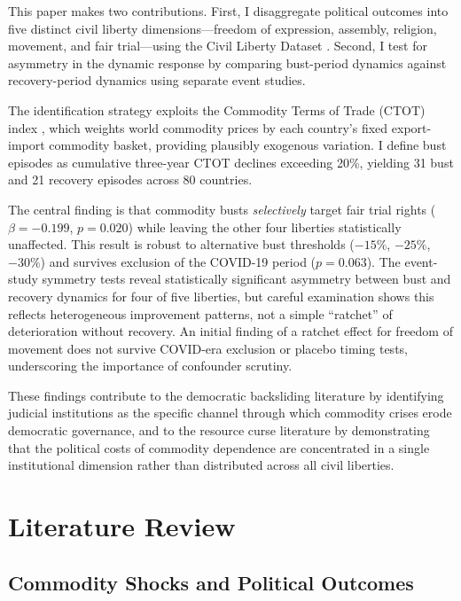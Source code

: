 \documentclass[12pt]{article}
\begin{document}
This paper makes two contributions. First, I disaggregate political outcomes into five distinct civil liberty dimensions---freedom of expression, assembly, religion, movement, and fair trial---using the Civil Liberty Dataset \citep{coppedge2023}. Second, I test for asymmetry in the dynamic response by comparing bust-period dynamics against recovery-period dynamics using separate event studies.

The identification strategy exploits the Commodity Terms of Trade (CTOT) index \citep{grussKebhaj2019}, which weights world commodity prices by each country's fixed export-import commodity basket, providing plausibly exogenous variation. I define bust episodes as cumulative three-year CTOT declines exceeding 20\%, yielding 31 bust and 21 recovery episodes across 80 countries.

The central finding is that commodity busts \textit{selectively} target fair trial rights ($\beta = -0.199$, $p = 0.020$) while leaving the other four liberties statistically unaffected. This result is robust to alternative bust thresholds ($-15\%$, $-25\%$, $-30\%$) and survives exclusion of the COVID-19 period ($p = 0.063$). The event-study symmetry tests reveal statistically significant asymmetry between bust and recovery dynamics for four of five liberties, but careful examination shows this reflects heterogeneous improvement patterns, not a simple ``ratchet'' of deterioration without recovery. An initial finding of a ratchet effect for freedom of movement does not survive COVID-era exclusion or placebo timing tests, underscoring the importance of confounder scrutiny.

These findings contribute to the democratic backsliding literature \citep{bermeo2016} by identifying judicial institutions as the specific channel through which commodity crises erode democratic governance, and to the resource curse literature \citep{ross2015} by demonstrating that the political costs of commodity dependence are concentrated in a single institutional dimension rather than distributed across all civil liberties.

\section{Literature Review}

\subsection{Commodity Shocks and Political Outcomes}
\end{document}
